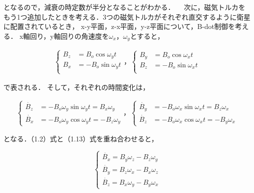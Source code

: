 となるので，減衰の時定数が半分となることがわかる．
　次に，磁気トルカをもう1つ追加したときを考える．3つの磁気トルカがそれぞれ直交するように衛星に配置されているとき，
x-y平面，z-x平面，y-z平面について，B-dot制御を考える．
x軸回り，y軸回りの角速度を$\omega_x$，$\omega_y$とすると，

\begin{align}
    \left\{
        \begin{aligned}
            B_z &= B_o\cos\omega_yt\\
            B_x &= -B_o\sin\omega_yt\\
        \end{aligned}                    
    \right.
    ，
    \left\{
        \begin{aligned}
            B_y &= B_o\cos\omega_xt\\
            B_z &= -B_o\sin\omega_xt\\
        \end{aligned}                    
    \right.
\end{align}

で表される．
そして，それぞれの時間変化は，

\begin{align}
    \left\{
        \begin{aligned}
            \dot{B_z} &= -B_o\omega_y\sin\omega_yt = B_x\omega_y\\
            \dot{B_x} &= -B_o\omega_y\cos\omega_yt = -B_z\omega_y
        \end{aligned}                    
    \right.
    ，
    \left\{
        \begin{aligned}
            \dot{B_y} &= -B_o\omega_x\sin\omega_xt = B_z\omega_x\\
            \dot{B_z} &= -B_o\omega_x\cos\omega_xt = -B_y\omega_x
        \end{aligned}                    
    \right.
\end{align}

となる．（1.2）式と（1.13）式を重ね合わせると，

\begin{equation}
    \left\{
        \begin{aligned}
            \dot{B_x} = B_y\omega_z - B_z\omega_y\\
            \dot{B_y} = B_z\omega_x - B_x\omega_z\\
            \dot{B_z} = B_x\omega_y - B_y\omega_x
        \end{aligned}
    \right.
\end{equation}

